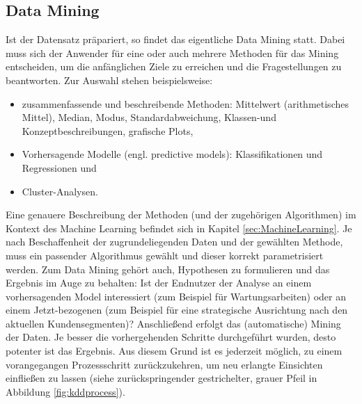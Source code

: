 \subsection{Data Mining}\label{subsubsec:DataMining}
Ist der Datensatz präpariert, so findet das eigentliche Data Mining statt. Dabei muss sich der Anwender für eine oder auch mehrere Methoden für das Mining entscheiden, um die anfänglichen Ziele zu erreichen und die Fragestellungen zu beantworten. Zur Auswahl stehen beispielsweise:
\begin{itemize}
\item zusammenfassende und beschreibende Methoden: Mittelwert (arithmetisches Mittel), Median, Modus, Standardabweichung, Klassen-und Konzeptbeschreibungen, grafische Plots,
\item Vorhersagende Modelle (engl. predictive models): Klassifikationen und Regressionen und
\item Cluster-Analysen.
\end{itemize}
Eine genauere Beschreibung der Methoden (und der zugehörigen Algorithmen) im Kontext des Machine Learning befindet sich in Kapitel \ref{sec:MachineLearning}. Je nach Beschaffenheit der zugrundeliegenden Daten und der gewählten Methode, muss ein passender Algorithmus gewählt und dieser korrekt parametrisiert werden. Zum Data Mining gehört auch, Hypothesen zu formulieren und das Ergebnis im Auge zu behalten: Ist der Endnutzer der Analyse an einem vorhersagenden Model interessiert (zum Beispiel für Wartungsarbeiten) oder an einem Jetzt-bezogenen (zum Beispiel für eine strategische Ausrichtung nach den aktuellen Kundensegmenten)?\newline
Anschließend erfolgt das (automatische) Mining der Daten. Je besser die vorhergehenden Schritte durchgeführt wurden, desto potenter ist das Ergebnis.\citep[S.~42]{fayyad_data_1996} Aus diesem Grund ist es jederzeit möglich, zu einem vorangegangen Prozessschritt zurückzukehren, um neu erlangte Einsichten einfließen zu lassen (siehe zurückspringender gestrichelter, grauer Pfeil in Abbildung \ref{fig:kddprocess}).

